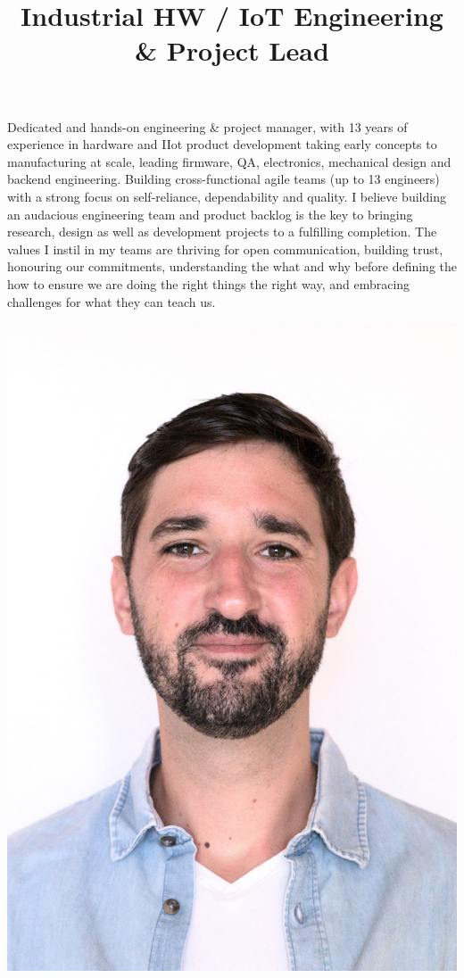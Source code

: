 \documentclass[10pt,a4paper]{moderncv}
\title{Industrial HW / IoT Engineering \& Project Lead}
\begin{document}
\makecvhead

\vspace{2em}


\vspace{0.5em}
\begin{minipage}{0.80\textwidth}
  Dedicated and hands-on engineering \& project manager, with 13 years of experience in hardware and IIot product development taking early concepts to manufacturing at scale, leading firmware, QA, electronics, mechanical design and backend engineering. Building cross-functional agile teams (up to 13 engineers) with a strong focus on self-reliance, dependability and quality. I believe building an audacious engineering team and product backlog is the key to bringing research, design as well as development projects to a fulfilling completion. The values I instil in my teams are thriving for open communication, building trust, honouring our commitments, understanding the what and why before defining the how to ensure we are doing the right things the right way, and embracing challenges for what they can teach us.
\end{minipage}
\hfill
\begin{minipage}{0.18\textwidth}
  \includegraphics[width=\linewidth]{portrait_freehand.jpg}%
  \vspace{0.1em}
\end{minipage}
\end{document}
